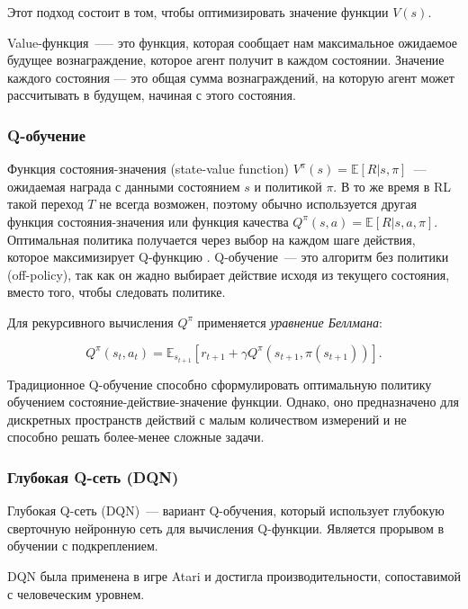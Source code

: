 Этот подход состоит в том, чтобы оптимизировать значение функции $V(s)$.

Value-функция~--— это функция, которая сообщает нам максимальное ожидаемое будущее вознаграждение, которое агент получит в каждом состоянии. Значение каждого состояния — это общая сумма вознаграждений, на которую агент может рассчитывать в будущем, начиная с этого состояния.

\subsubsection{Q-обучение}

Функция состояния-значения (state-value function) $V^\pi (s) = \mathbb{E}[R|s, \pi]$~--- ожидаемая награда с данными состоянием $s$ и политикой $\pi$. В то же время в RL такой переход $T$ не всегда возможен, поэтому обычно используется другая функция состояния-значения или функция качества ${Q^\pi(s,a) = \mathbb{E}[R|s, a, \pi]}$. Оптимальная политика получается через выбор на каждом шаге действия, которое максимизирует Q-функцию \cite{SuttonAndBarto-RL-Introduction-p107}. Q-обучение~--- это алгоритм без политики (off-policy), так как он жадно выбирает действие исходя из текущего состояния, вместо того, чтобы следовать политике.

Для рекурсивного вычисления $Q^\pi$ применяется {\itshape уравнение Беллмана}:

\begin{equation}
    \label{eq:q-learning-bellmanEq}
    Q^\pi(s_t, a_t) = \mathbb{E}_{s_{t+1}}[r_{t+1} + \gamma Q^\pi (s_{t+1}, \pi(s_{t+1}))].
\end{equation}

Традиционное Q-обучение способно сформулировать оптимальную политику обучением состояние-действие-значение функции. Однако, оно предназначено для дискретных пространств действий с малым количеством измерений и не способно решать более-менее сложные задачи.

\subsubsection{Глубокая Q-сеть (DQN)}

Глубокая Q-сеть (DQN)~--- вариант Q-обучения, который использует глубокую сверточную нейронную сеть для вычисления Q-функции. Является прорывом в обучении с подкреплением. \cite{bertsekas1996neuro}

DQN была применена в игре Atari и достигла производительности, сопоставимой с человеческим уровнем. \cite{Mnih2015}

